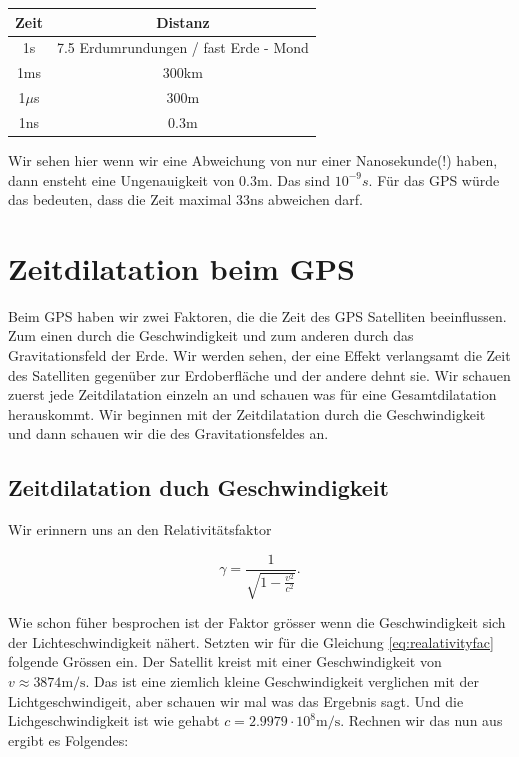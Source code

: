 \begin{refsection}
\begin{center}
\begin{tabular}{| c | c |}
\hline
Zeit & Distanz \\
\hline
1s & 7.5 Erdumrundungen / fast Erde - Mond \\
\hline
1ms & 300km \\
\hline
1$\mu$s & 300m \\
\hline
1ns & 0.3m \\
\hline
\end{tabular}
\end{center}

\noindent{}Wir sehen hier wenn wir eine Abweichung von nur einer Nanosekunde(!) haben, dann ensteht eine Ungenauigkeit von 0.3m. Das sind \(10^{-9}s\). Für das GPS würde das bedeuten, dass die Zeit maximal 33ns abweichen darf.

\section{Zeitdilatation beim GPS}
Beim GPS haben wir zwei Faktoren, die die Zeit des GPS Satelliten beeinflussen. Zum einen durch die Geschwindigkeit und zum anderen durch das Gravitationsfeld der Erde. Wir werden sehen, der eine Effekt verlangsamt die Zeit des Satelliten gegenüber zur Erdoberfläche und der andere dehnt sie. Wir schauen zuerst jede Zeitdilatation einzeln an und schauen was für eine Gesamtdilatation herauskommt. Wir beginnen mit der Zeitdilatation durch die Geschwindigkeit und dann schauen wir die des Gravitationsfeldes an.

\subsection{Zeitdilatation duch Geschwindigkeit}
Wir erinnern uns an den Relativitätsfaktor

\begin{equation}
\label{eq:realativityfac}
\gamma = \frac{1}{\sqrt{1 - \frac{v^2}{c^2}}}.
\end{equation}

\noindent{}Wie schon füher besprochen ist der Faktor grösser wenn die Geschwindigkeit sich der Lichteschwindigkeit nähert. Setzten wir für die Gleichung \ref{eq:realativityfac} folgende Grössen ein. Der Satellit kreist mit einer Geschwindigkeit von \(v \approx 3874 \text{m/s} \). Das ist eine ziemlich kleine Geschwindigkeit verglichen mit der Lichtgeschwindigeit, aber schauen wir mal was das Ergebnis sagt. Und die Lichgeschwindigkeit ist wie gehabt \(c = 2.9979 \cdot 10^8 \text{m/s}\). 
Rechnen wir das nun aus ergibt es Folgendes:\\


\end{refsection}
